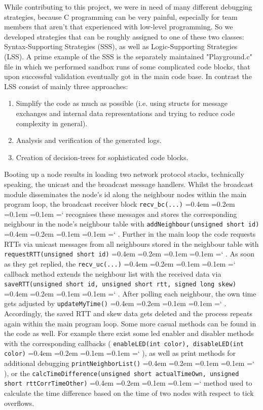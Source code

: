 \documentclass{llncs}
\newcommand{\code}[1]{%
	\texttt{#1}%
	\fontdimen2\font=0.4em
	\fontdimen3\font=0.2em
	\fontdimen4\font=0.1em
	\fontdimen7\font=0.1em
	\hyphenchar\font=`\-
}
\begin{document}
\noindent While contributing to this project, we were in need of many different debugging strategies, because C programming can be very painful, especially for team members that aren't that experienced with low-level programming.
So we developed strategies that can be roughly assigned to one of these two classes: Syntax-Supporting Strategies (SSS), as well as Logic-Supporting Strategies (LSS). 
A prime example of the SSS is the separately maintained "Playground.c" file in which we performed sandbox runs of some complicated code blocks, that upon successful validation eventually got in the main code base.
In contrast the LSS consist of mainly three approaches:
\begin{enumerate}
\item Simplify the code as much as possible (i.e. using structs for message exchanges and internal data representations and trying to reduce code complexity in general).
\item Analysis and verification of the generated logs.
\item Creation of decision-trees for sophisticated code blocks.
\end{enumerate}
Booting up a node results in loading two network protocol stacks, technically speaking, the unicast and the broadcast message handlers. Whilst the broadcast module disseminates the node's id along the neighbour nodes within the main program loop, the broadcast receiver block \code{recv\_bc(...)} recognises these messages and stores the corresponding neighbour in the node's neighbour table with \code{addNeighbour(unsigned short id)}. Further in the main loop the code requests RTTs via unicast messages from all neighbours stored in the neighbour table with \code{requestRTT(unsigned short id)}. As soon as they get replied, the \code{recv\_uc(...)} callback method extends the neighbour list with the received data via \code{saveRTT(unsigned short id, unsigned short rtt, signed long skew)}.
After polling each neighbour, the own time gets adjusted by \code{updateMyTime()}. Accordingly, the saved RTT and skew data gets deleted and the process repeats again within the main program loop.
Some more casual methods can be found in the code as well. For example there exist some led enabler and disabler methods with the corresponding callbacks (\code{enableLED(int color), disableLED(int color)}), as well as print methods for additional debugging \code{print\-Neighbor\-List()}), or the \code{calcTimeDifference(unsigned short actualTimeOwn, un\-sign\-ed short rttCorrTimeOther)} method used to calculate the time difference based on the time of two nodes with respect to tick overflows.
\end{document}
